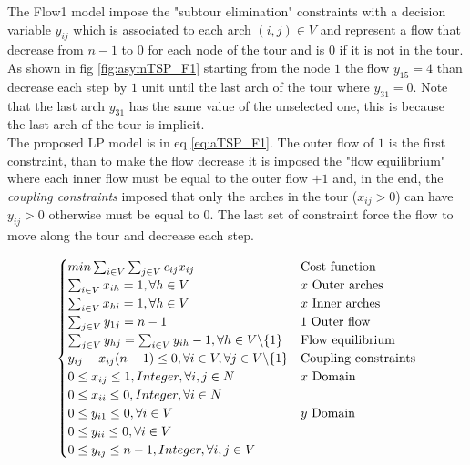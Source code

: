 The Flow1 model impose the "subtour elimination" constraints with a decision variable $ y_{ij} $ which is associated to each arch $ (i,j) \in V $ and represent a flow that decrease from $ n-1 $ to $ 0 $ for each node of the tour and is $ 0 $ if it is not in the tour. As shown in fig \ref{fig:asymTSP_F1} starting from the node $ 1 $ the flow $ y_{15} = 4 $ than decrease each step by $ 1 $ unit until the last arch of the tour where $ y_{31} = 0 $. Note that the last arch $ y_{31} $ has the same value of the unselected one, this is because the last arch of the tour is implicit. \\
The proposed LP model is in eq \ref{eq:aTSP_F1}. The outer flow of $ 1 $ is the first constraint, than to make the flow decrease it is imposed the "flow equilibrium" where each inner flow must be equal to the outer flow $ +1 $ and, in the end, the \textit{coupling constraints} imposed that only the arches in the tour ($ x_{ij} > 0 $) can have $ y_{ij} > 0 $ otherwise must be equal to $ 0 $. The last set of constraint force the flow to move along the tour and decrease each step. 

\begin{equation}
\begin{cases}
min \sum_{i\in V}\sum_{j\in V} c_{ij}x_{ij}  & \text{Cost function} \\
\sum_{i\in V} x_{ih} = 1, \forall h \in V  & \text{$ x $ Outer arches} \\
\sum_{i\in V} x_{hi} = 1, \forall h \in V  & \text{$ x $ Inner arches} \\
\sum_{j\in V} y_{1j} = n-1  & \text{$ 1 $ Outer flow} \\
\sum_{j\in V} y_{hj} = \sum_{i \in V}y_{ih} - 1, \forall h \in V \backslash \{1\}  & \text{Flow equilibrium} \\
y_{ij} - x_{ij}(n-1) \le 0, \forall i \in V, \forall j \in V \backslash \{1\}  & \text{Coupling constraints} \\
0 \le x_{ij} \le 1, Integer, \forall i,j \in N  & \text{$ x $ Domain} \\
0 \le x_{ii} \le 0, Integer, \forall i \in N & \text{} \\
0 \le y_{i1} \le 0, \forall i \in V  & \text{$ y $ Domain} \\
0 \le y_{ii} \le 0, \forall i \in V  & \text{} \\
0 \le y_{ij} \le n-1, Integer, \forall i,j \in V  & \text{} 
\end{cases}
\label{eq:aTSP_F1}
\end{equation}


